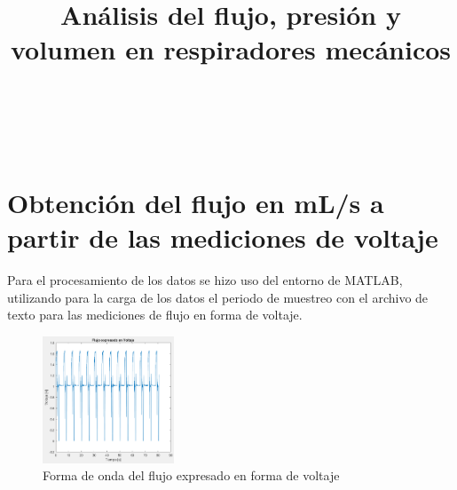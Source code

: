 \documentclass[conference]{IEEEtran}
\begin{document}
	
	\title{Análisis del flujo, presión y volumen en respiradores mecánicos}
	\author{
		\\
		\\
		\\
		\and
		\and
	}
	
	\maketitle
	\begin{abstract}
		
	\end{abstract}
	
	\begin{IEEEkeywords}
		
	\end{IEEEkeywords}
	
	\section{Obtención del flujo en mL/s a partir de las mediciones de voltaje}
	
	Para el procesamiento de los datos se hizo uso del entorno de MATLAB, utilizando para la carga de los datos el periodo de muestreo con el archivo de texto para las mediciones de flujo en forma de voltaje.
	
	\begin{figure}[h]
		\centering
		\includegraphics[width=0.35\textwidth]{./media/flujo-voltaje}
		\caption{Forma de onda del flujo expresado en forma de voltaje}
		\label{fig:flujo-voltaje}
	\end{figure}
	
\end{document}
